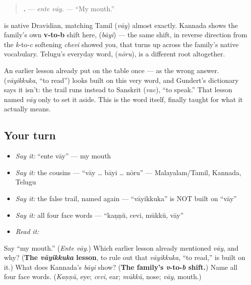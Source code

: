 \begin{quote}
\textbf{ .} — \emph{ente vāy.} — \textquotedblleft{}My mouth.\textquotedblright{}
\end{quote}

\begin{cousinweb}
\textbf{} is native Dravidian, matching Tamil \textbf{} (\emph{vāy}) almost exactly. Kannada shows the family's own \textbf{v‑to‑b} shift here, \textbf{} (\emph{bāyi}) — the same shift, in reverse direction from the \emph{k}‑to‑\emph{c} softening \emph{chevi} showed you, that turns up across the family's native vocabulary. Telugu's everyday word, \textbf{} (\emph{nōru}), is a different root altogether.

An earlier lesson already put \textbf{} on the table once — as the wrong answer. \textbf{} (\emph{vāyikkuka}, \textquotedblleft{}to read\textquotedblright{}) looks built on this very word, and Gundert's dictionary says it isn't: the trail runs instead to Sanskrit \textbf{} (\emph{vac}), \textquotedblleft{}to speak.\textquotedblright{} That lesson named \emph{vāy} only to set it aside. This is the word itself, finally taught for what it actually means.
\end{cousinweb}

\subsection*{Your turn}
\begin{itemize}
\raggedright
  \item \emph{Say it:} \textquotedblleft{}ente vāy\textquotedblright{} — my mouth
  \item \emph{Say it:} the cousins — \textquotedblleft{}vāy … bāyi … nōru\textquotedblright{} — Malayalam/Tamil, Kannada, Telugu
  \item \emph{Say it:} the false trail, named again — \textquotedblleft{}vāyikkuka\textquotedblright{} is NOT built on \textquotedblleft{}vāy\textquotedblright{}
  \item \emph{Say it:} all four face words — \textquotedblleft{}kaṇṇŭ, cevi, mūkkŭ, vāy\textquotedblright{}
  \item \emph{Read it:} \textbf{}
\end{itemize}

\begin{tcolorbox}[breakable,colback=teal!4,colframe=teal!35!black,title={Before you move on}]
Say \textquotedblleft{}my mouth.\textquotedblright{} (\emph{Ente vāy}.) Which earlier lesson already mentioned \emph{vāy}, and why? (\textbf{The \emph{vāyikkuka} lesson}, to rule out that \emph{vāyikkuka}, \textquotedblleft{}to read,\textquotedblright{} is built on it.) What does Kannada's \emph{bāyi} show? (\textbf{The family's \emph{v}-to-\emph{b} shift.}) Name all four face words. (\emph{Kaṇṇŭ}, eye; \emph{cevi}, ear; \emph{mūkkŭ}, nose; \emph{vāy}, mouth.)
\end{tcolorbox}
